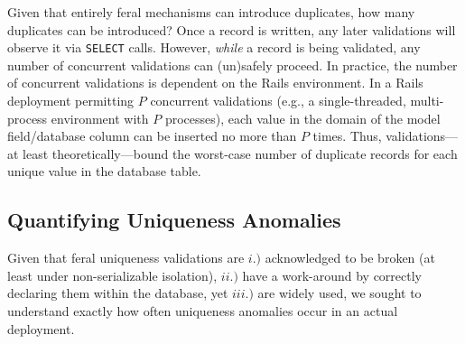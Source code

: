  Given that entirely feral
mechanisms can introduce duplicates, how many duplicates can be
introduced? Once a record is written, any later validations will
observe it via \texttt{SELECT} calls. However, \textit{while} a record
is being validated, any number of concurrent validations can
(un)safely proceed. In practice, the number of concurrent validations
is dependent on the Rails environment. In a Rails deployment
permitting $P$ concurrent validations (e.g., a single-threaded,
multi-process environment with $P$ processes), each value in the
domain of the model field/database column can be inserted no more than
$P$ times. Thus, validations---at least theoretically---bound the
worst-case number of duplicate records for each unique value in the
database table.

\subsection{Quantifying Uniqueness Anomalies}

Given that feral uniqueness validations are $i.)$ acknowledged to be
broken (at least under non-serializable isolation), $ii.)$ have a
work-around by correctly declaring them within the database, yet
$iii.)$ are widely used, we sought to understand exactly how often
uniqueness anomalies occur in an actual deployment.


